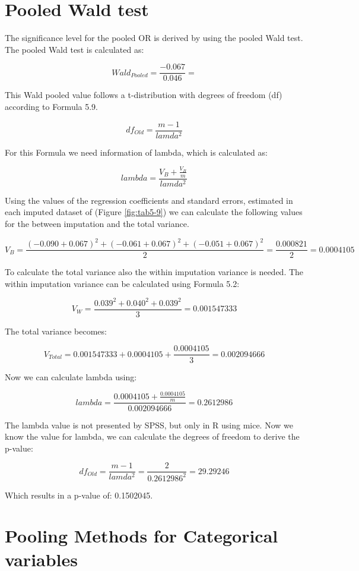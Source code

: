 \documentclass[
]{book}
\begin{document}
\hypertarget{pooled-wald-test}{%
\chapter{Pooled Wald test}\label{pooled-wald-test}}

The significance level for the pooled OR is derived by using the pooled Wald test. The pooled Wald test is calculated as:

\[Wald_{Pooled} =\frac{-0.067}{0.046}=\]

This Wald pooled value follows a t-distribution with degrees of freedom (df) according to Formula 5.9.

\[df_{Old} = \frac{m-1}{lamda^2}\]

For this Formula we need information of lambda, which is calculated as:

\[lambda = \frac{V_B + \frac{V_B}{m}}{lamda^2}\]

Using the values of the regression coefficients and standard errors, estimated in each imputed dataset of (Figure \ref{fig:tab5-9}) we can calculate the following values for the between imputation and the total variance.

\[V_B= \frac{(-0.090+0.067)^2 + (-0.061+0.067)^2 +(-0.051+0.067)^2}{2}=\frac{0.000821}{2}=0.0004105\]

To calculate the total variance also the within imputation variance is needed. The within imputation variance can be calculated using Formula 5.2:

\[V_W= \frac{0.039^2 + 0.040^2 + 0.039^2}{3}=0.001547333\]

The total variance becomes:

\[V_{Total} = 0.001547333+0.0004105+ \frac{0.0004105}{3}=0.002094666\]

Now we can calculate lambda using:

\[lambda = \frac{0.0004105 + \frac{0.0004105}{m}}{0.002094666}=0.2612986\]

The lambda value is not presented by SPSS, but only in R using mice. Now we know the value for lambda, we can calculate the degrees of freedom to derive the p-value:

\[df_{Old} = \frac{m-1}{lamda^2}=\frac{2}{0.2612986^2}=29.29246\]

Which results in a p-value of: 0.1502045.

\hypertarget{pooling-methods-for-categorical-variables}{%
\chapter{Pooling Methods for Categorical variables}\label{pooling-methods-for-categorical-variables}}
\end{document}
